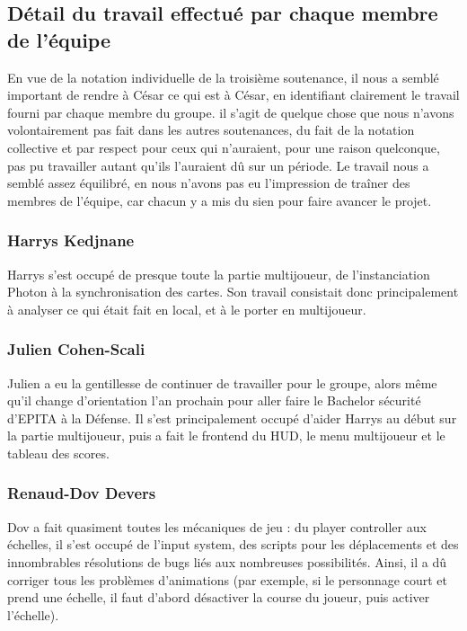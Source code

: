 \subsection{Détail du travail effectué par chaque membre de l'équipe}

    En vue de la notation individuelle de la troisième soutenance, il nous a semblé important de rendre à César ce qui est à César, en identifiant 
    clairement le travail fourni par chaque membre du groupe. il s'agit de quelque chose que nous n'avons volontairement pas fait dans les autres soutenances, 
    du fait de la notation collective et par respect pour ceux qui n'auraient, pour une raison quelconque, pas pu travailler autant qu'ils l'auraient dû sur un période. 
    Le travail nous a semblé assez équilibré, en nous n'avons pas eu l'impression de traîner des membres de l'équipe, car chacun y a mis du sien pour faire 
    avancer le projet.

    \vspace{0.5cm}
    \subsubsection{Harrys Kedjnane}

        Harrys s'est occupé de presque toute la partie multijoueur, de l'instanciation Photon à la synchronisation des cartes. Son travail 
        consistait donc principalement à analyser ce qui était fait en local, et à le porter en multijoueur.

    \vspace{0.5cm}
    \subsubsection{Julien Cohen-Scali}

        Julien a eu la gentillesse de continuer de travailler pour le groupe, alors même qu'il change d'orientation l'an prochain pour aller 
        faire le Bachelor sécurité d'EPITA à la Défense. Il s'est principalement occupé d'aider Harrys au début sur la partie multijoueur, 
        puis a fait le frontend du HUD, le menu multijoueur et le tableau des scores.

    \vspace{0.5cm}
    \subsubsection{Renaud-Dov Devers}

        Dov a fait quasiment toutes les mécaniques de jeu : du player controller aux échelles, il s'est occupé de l'input system, des scripts 
        pour les déplacements et des innombrables résolutions de bugs liés aux nombreuses possibilités. Ainsi, il a dû corriger tous les problèmes d'animations 
        (par exemple, si le personnage court et prend une échelle, il faut d'abord désactiver la course du joueur, puis activer l'échelle).

